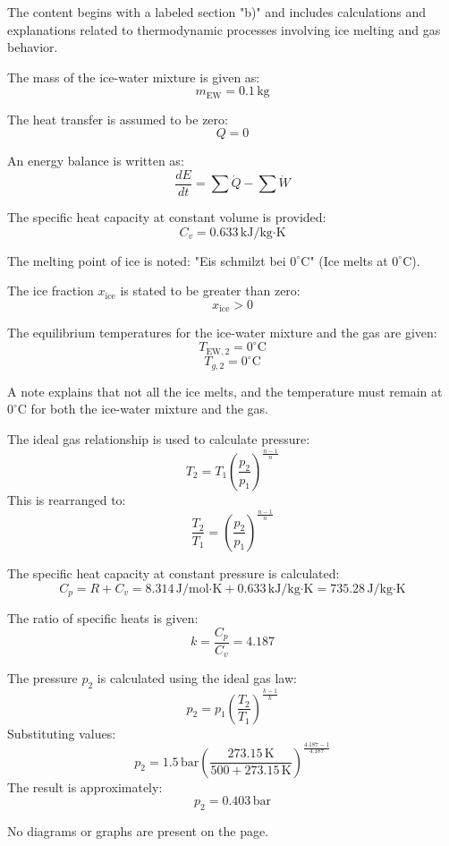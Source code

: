 The content begins with a labeled section "b)" and includes calculations and explanations related to thermodynamic processes involving ice melting and gas behavior.  

The mass of the ice-water mixture is given as:  
\[
m_{\text{EW}} = 0.1 \, \text{kg}
\]  

The heat transfer is assumed to be zero:  
\[
Q = 0
\]  

An energy balance is written as:  
\[
\frac{dE}{dt} = \sum \dot{Q} - \sum \dot{W}
\]  

The specific heat capacity at constant volume is provided:  
\[
C_v = 0.633 \, \text{kJ/kg·K}
\]  

The melting point of ice is noted:  
"Eis schmilzt bei \( 0^\circ\text{C} \)" (Ice melts at \( 0^\circ\text{C} \)).  

The ice fraction \( x_{\text{ice}} \) is stated to be greater than zero:  
\[
x_{\text{ice}} > 0
\]  

The equilibrium temperatures for the ice-water mixture and the gas are given:  
\[
T_{\text{EW},2} = 0^\circ\text{C}
\]  
\[
T_{g,2} = 0^\circ\text{C}
\]  

A note explains that not all the ice melts, and the temperature must remain at \( 0^\circ\text{C} \) for both the ice-water mixture and the gas.  

The ideal gas relationship is used to calculate pressure:  
\[
T_2 = T_1 \left( \frac{p_2}{p_1} \right)^{\frac{n-1}{n}}
\]  
This is rearranged to:  
\[
\frac{T_2}{T_1} = \left( \frac{p_2}{p_1} \right)^{\frac{n-1}{n}}
\]  

The specific heat capacity at constant pressure is calculated:  
\[
C_p = R + C_v = 8.314 \, \text{J/mol·K} + 0.633 \, \text{kJ/kg·K} = 735.28 \, \text{J/kg·K}
\]  

The ratio of specific heats is given:  
\[
k = \frac{C_p}{C_v} = 4.187
\]  

The pressure \( p_2 \) is calculated using the ideal gas law:  
\[
p_2 = p_1 \left( \frac{T_2}{T_1} \right)^{\frac{k-1}{k}}
\]  
Substituting values:  
\[
p_2 = 1.5 \, \text{bar} \left( \frac{273.15 \, \text{K}}{500 + 273.15 \, \text{K}} \right)^{\frac{4.187 - 1}{4.187}}
\]  
The result is approximately:  
\[
p_2 = 0.403 \, \text{bar}
\]  

No diagrams or graphs are present on the page.